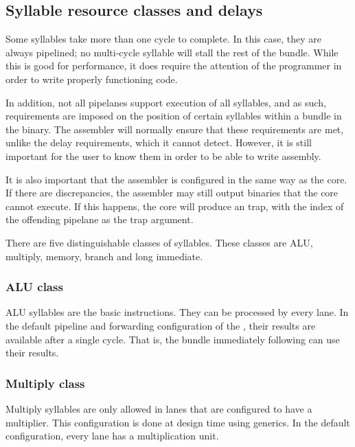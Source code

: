 \subsection{Syllable resource classes and delays}
\label{sec:core-ug-isa-syl-classes}

Some syllables take more than one cycle to complete. In this case, they are
always pipelined; no multi-cycle syllable will stall the rest of the bundle.
While this is good for performance, it does require the attention of the
programmer in order to write properly functioning code.

In addition, not all pipelanes support execution of all syllables, and as such, 
requirements are imposed on the position of certain syllables within a bundle in 
the binary. The assembler will normally ensure that these requirements are met, 
unlike the delay requirements, which it cannot detect. However, it is still 
important for the user to know them in order to be able to write assembly.

It is also important that the assembler is configured in the same way as the
core. If there are discrepancies, the assembler may still output binaries that
the core cannot execute. If this happens, the core will produce an
 trap, with the index of the offending pipelane as the trap
argument.

There are five distinguishable classes of syllables. These classes are ALU,
multiply, memory, branch and long immediate.


\subsubsection{ALU class}
\label{sec:core-ug-isa-syl-classes-alu}

ALU syllables are the basic \rvex{} instructions. They can be processed by every
lane. In the default pipeline and forwarding configuration of the \rvex{}, their
results are available after a single cycle. That is, the bundle immediately
following can use their results.


\subsubsection{Multiply class}
\label{sec:core-ug-isa-syl-classes-mul}

Multiply syllables are only allowed in lanes that are configured to have a
multiplier. This configuration is done at design time using generics. In the
default configuration, every lane has a multiplication unit.

